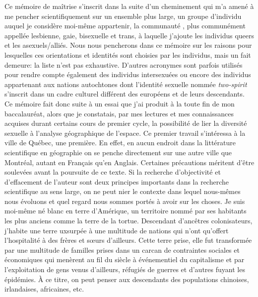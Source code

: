 Ce mémoire de maîtrise s'inscrit dans la suite d'un cheminement qui m'a amené à me pencher scientifiquement sur un ensemble plus large, un groupe d'individu auquel je considère moi-même appartenir, la communauté \lgbt{}, plus communément appellée lesbienne, gaie, bisexuelle et trans, à laquelle j'ajoute les individus queers et les asexuels/alliés.
Nous nous pencherons dans ce mémoire sur les raisons pour lesquelles ces orientations et identités sont choisies par les individus, mais un fait demeure: la liste n'est pas exhaustive.
D'autres acronymes sont parfois utilisés pour rendre compte également des individus intersexuées ou encore des individus appartenant aux nations autochtones dont l'identité sexuelle nommée \emph{two-spirit} s'inscrit dans un cadre culturel différent des européens et de leurs descendants.
Ce mémoire fait donc suite à un essai que j'ai produit à la toute fin de mon baccalauréat, alors que je constatais, par mes lectures et mes connaissances acquises durant certains cours de premier cycle, la possibilité de lier la diversité sexuelle à l'analyse géographique de l'espace.
Ce premier travail s'intéressa à la ville de Québec, une première.
En effet, en aucun endroit dans la littérature scientifique en géographie on se penche directement sur une autre ville que Montréal, autant en Français qu'en Anglais.
Certaines précautions méritent d'être soulevées avant la poursuite de ce texte.
Si la recherche d'objectivité et d'effacement de l'auteur sont deux principes importants dans la recherche scientifique au sens large, on ne peut nier le contexte dans lequel nous-mêmes nous évoluons et quel regard nous sommes portés à avoir sur les choses.
Je suis moi-même né blanc en terre d'Amérique, un territoire nommé par ses habitants les plus anciens comme la terre de la tortue.
Descendant d'ancêtres colonisateurs, j'habite une terre uxsurpée à une multitude de nations qui n'ont qu'offert l'hospitalité à des frères et sœurs d'ailleurs.
Cette terre prise, elle fut transformée par une multitude de familles prises dans un carcan de contraintes sociales et économiques qui menèrent au fil du siècle à événementiel du capitalisme et par l'exploitation de gens venus d'ailleurs, réfugiés de guerres et d'autres fuyant les épidémies.
À ce titre, on peut penser aux descendants des populations chinoises, irlandaises, africaines, etc.
